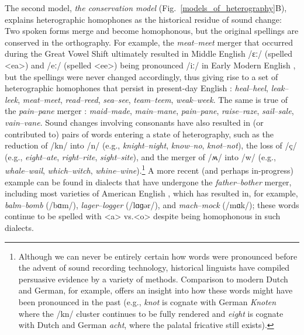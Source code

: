\documentclass[doc,biblatex]{apa7}
\begin{document}
The second model, \textit{the conservation model} (Fig.~\ref{models_of_heterography}B), explains heterographic homophones as the historical residue of sound change: Two spoken forms merge and become homophonous, but the original spellings are conserved in the orthography. For example, the \textit{meat}--\textit{meet} merger that occurred during the Great Vowel Shift ultimately resulted in Middle English /ɛː/ (spelled <ea>) and /eː/ (spelled <ee>) being pronounced /iː/ in Early Modern English \parencite{Lass:2000}, but the spellings were never changed accordingly, thus giving rise to a set of heterographic homophones that persist in present-day English \parencite[pp.~140--141]{Wells:1982}: \textit{heal}--\textit{heel}, \textit{leak}--\textit{leek}, \textit{meat}--\textit{meet}, \textit{read}--\textit{reed}, \textit{sea}--\textit{see}, \textit{team}--\textit{teem}, \textit{weak}--\textit{week}. The same is true of the \textit{pain}--\textit{pane} merger \parencite[pp.~141--142]{Wells:1982}: \textit{maid}--\textit{made}, \textit{main}--\textit{mane}, \textit{pain}--\textit{pane}, \textit{raise}--\textit{raze}, \textit{sail}--\textit{sale}, \textit{vain}--\textit{vane}. Sound changes involving consonants have also resulted in (or contributed to) pairs of words entering a state of heterography, such as the reduction of /kn/ into /n/ (e.g., \textit{knight}--\textit{night}, \textit{know}--\textit{no}, \textit{knot}--\textit{not}), the loss of /ç/ (e.g., \textit{eight}--\textit{ate}, \textit{right}--\textit{rite}, \textit{sight}--\textit{site}), and the merger of /ʍ/ into /w/ (e.g., \textit{whale}--\textit{wail}, \textit{which}--\textit{witch}, \textit{whine}--\textit{wine}).\footnote{Although we can never be entirely certain how words were pronounced before the advent of sound recording technology, historical linguists have compiled persuasive evidence by a variety of methods. Comparison to modern Dutch and German, for example, offers an insight into how these words might have been pronounced in the past (e.g., \textit{knot} is cognate with German \textit{Knoten} where the /kn/ cluster continues to be fully rendered and \textit{eight} is cognate with Dutch and German \textit{acht}, where the palatal fricative still exists).} A more recent (and perhaps in-progress) example can be found in dialects that have undergone the \textit{father}--\textit{bother} merger, including most varieties of American English \parencite[p.~169]{Labov:2005}, which has resulted in, for example, \textit{balm}--\textit{bomb} (/bɑm/), \textit{lager}--\textit{logger} (/lɑɡər/), and \textit{mach}--\textit{mock} (/mɑk/); these words continue to be spelled with <a> vs.\@ <o> despite being homophonous in such dialects.
\end{document}
